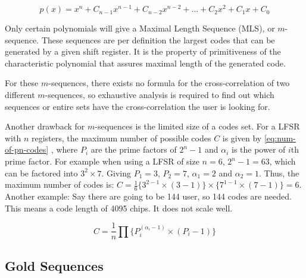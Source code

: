 		\begin{equation}
			\label{eq:lfsr-polynomial}
			p(x) = x^n + C_{n-1} x^{n-1}  + C_{n-2} x^{n-2} + \dotsc + C_{2} x^{2}  + C_{1} x  + C_{0}
		\end{equation}


		Only certain polynomials will give a Maximal Length Sequence (MLS), or $m$-sequence.
		These sequences are per definition the largest codes that can be generated by a given shift register.
		It is the property of primitiveness of the characteristic polynomial that assures maximal length of the generated code. 


		For these $m$-sequences, there exists no formula for the cross-correlation of two different $m$-sequences, so exhaustive analysis is required to find out which sequences or entire sets have the cross-correlation the user is looking for.

		Another drawback for $m$-sequences is the limited size of a codes set.
		For a LFSR with $n$ registers, the maximum number of possible codes $C$ is given by \autoref{eq:num-of-pn-codes} \cite{mutagi1996pseudo}, where $P_i$ are the prime factors of $2^n - 1$ and $\alpha_i$ is the power of $i$th prime factor.
		For example when using a LFSR of size $n = 6$, $2^n - 1 = 63$, which can be factored into $3^2 \times 7$.
		Giving $P_1 = 3$, $P_2 = 7$, $\alpha_1 = 2$ and $\alpha_2 = 1$.
		Thus, the maximum number of codes is: $C = \frac{1}{6} \{ 3^{2 - 1} \times (3 - 1) \} \times \{ 7^{1 - 1} \times (7 - 1) \} = 6$.
		Another example: Say there are going to be 144 user, so 144 codes are needed. 
		This means a code length of 4095 chips.
		It does not scale well.

		\begin{equation}
			\label{eq:num-of-pn-codes}
			C = \frac{1}{n} \prod \{ P_{i} ^ {(\alpha_i - 1)} \times (P_i - 1) \}
		\end{equation}

	\subsection{Gold Sequences}

